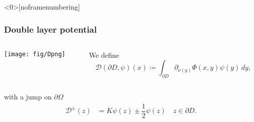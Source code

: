 \documentclass[10pt,xcolor={dvipsnames}]{beamer}
\theoremstyle{plain}
\theoremstyle{plain}
\begin{document}
\begin{frame}<0>[noframenumbering]
 \frametitle{Double layer potential}
\begin{columns}[T]
  \begin{column}{0.50\textwidth}
  \vspace{-0.2cm}
  \texttt{[image: fig/Dpng]}
  \end{column}
  \begin{column}{0.50\textwidth}
  \vspace{2cm}
   We define
   \begin{equation*}
    \mathcal{D}(\partial D,\psi)(x)\coloneqq \int_{\partial D} \partial_{\nu(y)}\Phi(x, y)\psi(y)\, dy,
    \label{eq:definition-double-layer}
   \end{equation*}
  \end{column}
 \end{columns}
 \vspace{0.1cm}
   with a jump on $\partial\Omega$
  \begin{align*}
   \mathcal{D}^\pm(z) &= K\psi(z) \pm\dfrac{1}{2}\psi(z)\quad z\in\partial D. \label{eq:double-pm-0}
  \end{align*}
 \end{frame}
\end{document}
